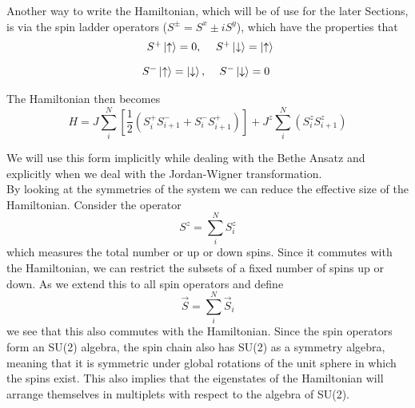\documentclass[../intro.tex,../../main.tex]{subfiles}
\begin{document}
Another way to write the Hamiltonian, which will be of use for the later Sections, is via the spin ladder operators ($S^{\pm}=S^{x}\pm iS^{y}$), which have the properties that
\begin{equation}
    \begin{array}{cc}
        S^{+}\ket{\uparrow}=0, & S^{+}\ket{\downarrow}=\ket{\uparrow} \\[10pt]
        S^{-}\ket{\uparrow}=\ket{\downarrow}, & S^{-}\ket{\downarrow}=0
    \end{array}
\end{equation}

The Hamiltonian then becomes
\begin{equation}
    H=J\sum_{i}^{N}\left[\frac{1}{2}(S_{i}^{+}S_{i+1}^{-}+S_{i}^{-}S_{i+1}^{+})\right]+J^{z}\sum_{i}^{N}(S_{i}^{z}S_{i+1}^{z})
\end{equation}

We will use this form implicitly while dealing with the Bethe Ansatz and explicitly when we deal with the Jordan-Wigner transformation.\\

By looking at the symmetries of the system we can reduce the effective size of the Hamiltonian. Consider the operator
\begin{equation}
    S^{z}=\sum_{i}^{N}S_{i}^{z}
\end{equation}
which measures the total number or up or down spins. Since it commutes with the Hamiltonian, we can restrict the subsets of a fixed number of spins up or down. As we extend this to all spin operators and define
\begin{equation}
    \vec{S}=\sum_{i}^{N}\vec{S}_{i}
\end{equation}
we see that this also commutes with the Hamiltonian. Since the spin operators form an SU(2) algebra, the spin chain also has SU(2) as a symmetry algebra, meaning that it is symmetric under global rotations of the unit sphere in which the spins exist. This also implies that the eigenstates of the Hamiltonian will arrange themselves in multiplets with respect to the algebra of SU(2).
\end{document}
